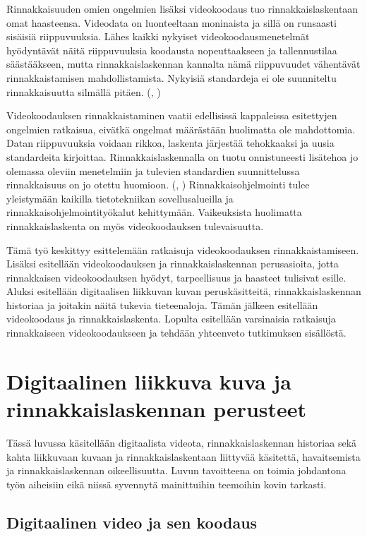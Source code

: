 Rinnakkaisuuden omien ongelmien lisäksi videokoodaus tuo rinnakkaislaskentaan
omat haasteensa. Videodata on luonteeltaan moninaista ja sillä on runsaasti
sisäisiä riippuvuuksia. Lähes kaikki nykyiset videokoodausmenetelmät
hyödyntävät näitä riippuvuuksia koodausta nopeuttaakseen ja tallennustilaa
säästääkseen, mutta rinnakkaislaskennan kannalta nämä riippuvuudet vähentävät
rinnakkaistamisen mahdollistamista. Nykyisiä standardeja ei ole suunniteltu
rinnakkaisuutta silmällä pitäen. (\citealt{pieters}, \citealt{xu})

Videokoodauksen rinnakkaistaminen vaatii edellisissä kappaleissa esitettyjen
ongelmien ratkaisua, eivätkä ongelmat määrästään huolimatta ole mahdottomia.
Datan riippuvuuksia voidaan rikkoa, laskenta järjestää tehokkaaksi ja uusia
standardeita kirjoittaa. Rinnakkaislaskennalla on tuotu onnistuneesti lisätehoa
jo olemassa oleviin menetelmiin ja tulevien standardien suunnittelussa
rinnakkaisuus on jo otettu huomioon. (\citealt{li}, \citealt{chi})
Rinnakkaisohjelmointi tulee yleistymään kaikilla tietotekniikan
sovellusalueilla ja rinnakkaisohjelmointityökalut kehittymään. Vaikeuksista
huolimatta rinnakkaislaskenta on myös videokoodauksen tulevaisuutta.

Tämä työ keskittyy esittelemään ratkaisuja videokoodauksen rinnakkaistamiseen.
Lisäksi esitellään videokoodauksen ja rinnakkaislaskennan perusasioita, jotta
rinnakkaisen videokoodauksen hyödyt, tarpeellisuus ja haasteet tulisivat
esille. Aluksi esitellään digitaalisen liikkuvan kuvan peruskäsitteitä,
rinnakkaislaskennan historiaa ja joitakin näitä tukevia tieteenaloja. Tämän
jälkeen esitellään videokoodaus ja rinnakkaislaskenta. Lopulta esitellään
varsinaisia ratkaisuja rinnakkaiseen videokoodaukseen ja tehdään yhteenveto
tutkimuksen sisällöstä.

\newpage

\section{Digitaalinen liikkuva kuva ja rinnakkaislaskennan perusteet}

Tässä luvussa käsitellään digitaalista videota, rinnakkaislaskennan historiaa
sekä kahta liikkuvaan kuvaan ja rinnakkaislaskentaan liittyvää käsitettä,
havaitsemista ja rinnakkaislaskennan oikeellisuutta. Luvun tavoitteena on
toimia johdantona työn aiheisiin eikä niissä syvennytä mainittuihin teemoihin
kovin tarkasti.

\subsection{Digitaalinen video ja sen koodaus}

